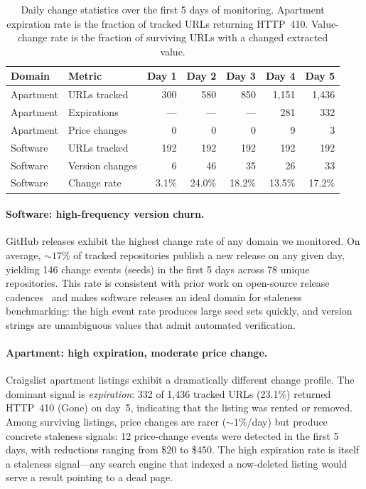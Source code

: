 \begin{table}[t]
  \centering
  \caption{Daily change statistics over the first 5 days of monitoring.
           Apartment expiration rate is the fraction of tracked URLs returning HTTP~410.
           Value-change rate is the fraction of surviving URLs with a changed extracted value.}
  \label{tab:changerates}
  \begin{tabular}{llrrrrr}
    \toprule
    Domain & Metric & Day 1 & Day 2 & Day 3 & Day 4 & Day 5 \\
    \midrule
    Apartment & URLs tracked    & 300 & 580 & 850 & 1,151 & 1,436 \\
    Apartment & Expirations     & --- & --- & --- & 281 & 332 \\
    Apartment & Price changes   & 0 & 0 & 0 & 9 & 3 \\
    \midrule
    Software  & URLs tracked    & 192 & 192 & 192 & 192 & 192 \\
    Software  & Version changes & 6 & 46 & 35 & 26 & 33 \\
    Software  & Change rate     & 3.1\% & 24.0\% & 18.2\% & 13.5\% & 17.2\% \\
    \bottomrule
  \end{tabular}
\end{table}

\paragraph{Software: high-frequency version churn.}
GitHub releases exhibit the highest change rate of any domain we monitored.
On average, ${\sim}17\%$ of tracked repositories publish a new release on any
given day, yielding 146 change events (seeds) in the first 5 days across 78
unique repositories. This rate is consistent with prior work on open-source
release cadences~\citep{goeminne2015towards} and makes software releases an
ideal domain for staleness benchmarking: the high event rate produces large
seed sets quickly, and version strings are unambiguous values that admit
automated verification.

\paragraph{Apartment: high expiration, moderate price change.}
Craigslist apartment listings exhibit a dramatically different change profile.
The dominant signal is \emph{expiration}: 332 of 1,436 tracked URLs (23.1\%)
returned HTTP~410 (Gone) on day~5, indicating that the listing was rented or
removed. Among surviving listings, price changes are rarer (${\sim}1\%$/day)
but produce concrete staleness signals: 12 price-change events were detected
in the first 5 days, with reductions ranging from \$20 to \$450.
The high expiration rate is itself a staleness signal---any search engine that
indexed a now-deleted listing would serve a result pointing to a dead page.

